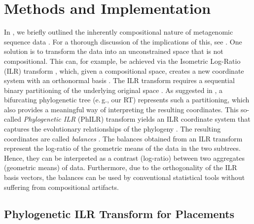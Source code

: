 
\section{Methods and Implementation}
\label{ch:Balances:sec:Methods}

In , 
we briefly outlined the inherently compositional nature of metagenomic sequence data \cite{Gloor2017}.
For a thorough discussion of the implications of this, see .
One solution is to transform the data into an unconstrained space that is not compositional.
This can, for example, be achieved via the Isometric Log-Ratio (ILR) transform \cite{Egozcue2003},
which, given a compositional space, creates a new coordinate system with an orthonormal basis \cite{Egozcue2005}.
The ILR transform requires a sequential binary partitioning of the underlying original space \cite{Pawlowsky-Glahn2015}.
As suggested in ,
a bifurcating phylogenetic tree (e.\,g., our \ac{RT}) represents such a partitioning,
which also provides a meaningful way of interpreting the resulting coordinates.
This so-called \emph{Phylogenetic ILR} (PhILR) transform yields an ILR coordinate system
that captures the evolutionary relationships of the phylogeny \cite{Silverman2017}.
The resulting coordinates are called \emph{balances} \cite{Egozcue2003,Egozcue2005}.
The balances obtained from an ILR transform represent the log-ratio of the geometric means of the data in the two subtrees.
Hence, they can be interpreted as a contrast (log-ratio) between two aggregates (geometric means) of data.
Furthermore, due to the orthogonality of the ILR basis vectors,
the balances can be used by conventional statistical tools without suffering from compositional artifacts.


\subsection{Phylogenetic ILR Transform for Placements}
\label{ch:Balances:sec:Methods:sub:ILRTransform}

